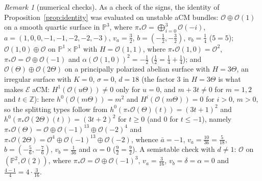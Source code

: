 \documentclass[11pt]{amsart}
\theoremstyle{remark}
\newtheorem{remark}[theorem]{Remark}
\theoremstyle{definition}
\newcommand{\PP}{\mathbb{P}}
\newcommand{\ZZ}{\mathbb{Z}}
\newcommand{\cO}{\mathcal{O}}
\newcommand{\cE}{\mathcal{E}}
\begin{document}
\begin{remark}[numerical checks]\label{rem:checks}
As a check of the signs, the identity of Proposition~\ref{prop:identity} was evaluated on unstable aCM bundles: $\cO\oplus\cO(1)$ on a smooth quartic surface in $\PP^3$, where $\pi_*\cO=\bigoplus_{i=0}^3\cO(-i)$, $a=(1,0,0,-1,-1,-2,-2,-3)$, $v_a=\tfrac32$, $b=(-\tfrac12,-\tfrac32)$, $v_b=\tfrac14$ ($5=5$); $\cO(1,0)\oplus\cO$ on $\PP^1\times\PP^1$ with $H=\cO(1,1)$, where $\pi_*\cO(1,0)=\cO^2$, $\pi_*\cO=\cO\oplus\cO(-1)$ and $\alpha(\cO(1,0))^2=-\tfrac12$ ($\tfrac12=\tfrac14+\tfrac14$); and $\cO(\Theta)\oplus\cO(2\Theta)$ on a principally polarized abelian surface with $H=3\Theta$, an irregular surface with $K=0$, $\sigma=0$, $d=18$ (the factor $3$ in $H=3\Theta$ is what makes $\cE$ aCM: $H^1(\cO(u\Theta))\ne0$ only for $u=0$, and $m+3t\ne0$ for $m=1,2$ and $t\in\ZZ$): here $h^0(\cO(m\Theta))=m^2$ and $H^i(\cO(m\Theta))=0$ for $i>0$, $m>0$, so the splitting types follow from $h^0(\pi_*\cO(\Theta)(t))=(3t+1)^2$ and $h^0(\pi_*\cO(2\Theta)(t))=(3t+2)^2$ for $t\ge0$ (and $0$ for $t\le-1$), namely $\pi_*\cO(\Theta)=\cO\oplus\cO(-1)^{13}\oplus\cO(-2)^4$ and $\pi_*\cO(2\Theta)=\cO^4\oplus\cO(-1)^{13}\oplus\cO(-2)$, whence $\bar a=-1$, $v_a=\tfrac{10}{36}=\tfrac5{18}$, $b=(-\tfrac56,-\tfrac76)$, $v_b=\tfrac1{36}$ and $\alpha=0$ ($\tfrac92=\tfrac92$). A semistable check with $d\ne1$: $\cO$ on $(\PP^2,\cO(2))$, where $\pi_*\cO=\cO\oplus\cO(-1)^3$, $v_a=\tfrac3{16}$, $v_b=\delta=\alpha=0$ and $\tfrac{4-1}4=4\cdot\tfrac3{16}$.
\end{remark}
\end{document}
